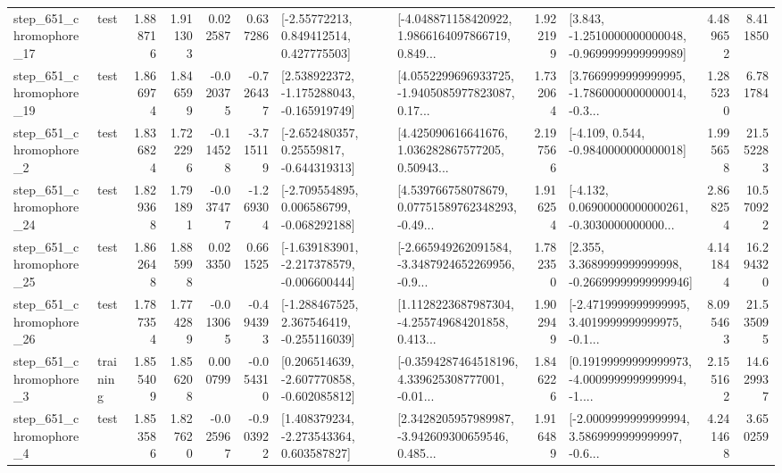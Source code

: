 \begin{tabular}{llrrrrllrlrr}
  step\_651\_chromophore\_17 &      test &      1.888716 &    1.911303 &      0.022587 &  0.637286 &     [-2.55772213, 0.849412514, 0.427775503] &  [-4.048871158420922, 1.9866164097866719, 0.849... &       1.922199 &  [3.843, -1.2510000000000048, -0.9699999999999989] &            4.489652 &          8.411850 \\
  step\_651\_chromophore\_19 &      test &      1.866974 &    1.846599 &     -0.020375 & -0.726437 &   [2.538922372, -1.175288043, -0.165919749] &  [4.0552299696933725, -1.9405085977823087, 0.17... &       1.732064 &  [3.7669999999999995, -1.7860000000000014, -0.3... &            1.285230 &          6.781784 \\
   step\_651\_chromophore\_2 &      test &      1.836824 &    1.722296 &     -0.114528 & -3.715119 &    [-2.652480357, 0.25559817, -0.644319313] &  [4.425090616641676, 1.036282867577205, 0.50943... &       2.197566 &               [-4.109, 0.544, -0.9840000000000018] &            1.995658 &         21.552283 \\
  step\_651\_chromophore\_24 &      test &      1.829368 &    1.791891 &     -0.037477 & -1.269304 &   [-2.709554895, 0.006586799, -0.068292188] &  [4.539766758078679, 0.07751589762348293, -0.49... &       1.916254 &  [-4.132, 0.06900000000000261, -0.3030000000000... &            2.868254 &         10.570922 \\
  step\_651\_chromophore\_25 &      test &      1.862648 &    1.885998 &      0.023350 &  0.661525 &  [-1.639183901, -2.217378579, -0.006600444] &  [-2.665949262091584, -3.3487924652269956, -0.9... &       1.782350 &  [2.355, 3.3689999999999998, -0.26699999999999946] &            4.141844 &         16.294320 \\
  step\_651\_chromophore\_26 &      test &      1.787354 &    1.774289 &     -0.013065 & -0.494393 &   [-1.288467525, 2.367546419, -0.255116039] &  [1.1128223687987304, -4.255749684201858, 0.413... &       1.902949 &  [-2.4719999999999995, 3.4019999999999975, -0.1... &            8.095463 &         21.535095 \\
   step\_651\_chromophore\_3 &  training &      1.855409 &    1.856208 &      0.000799 & -0.054310 &   [0.206514639, -2.607770858, -0.602085812] &  [-0.3594287464518196, 4.339625308777001, -0.01... &       1.846226 &  [0.19199999999999973, -4.0009999999999994, -1.... &            2.155162 &         14.629937 \\
   step\_651\_chromophore\_4 &      test &      1.853586 &    1.827620 &     -0.025967 & -0.903922 &    [1.408379234, -2.273543364, 0.603587827] &  [2.3428205957989987, -3.942609300659546, 0.485... &       1.916489 &  [-2.0009999999999994, 3.5869999999999997, -0.6... &            4.241468 &          3.650259 \\

\end{tabular}

